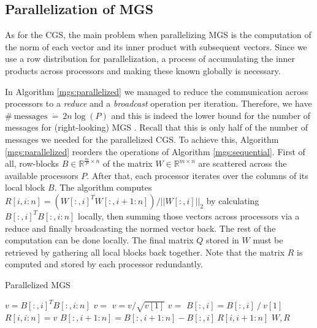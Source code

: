 \documentclass{article}
\begin{document}
\subsection{Parallelization of MGS}
As for the CGS, the main problem when parallelizing MGS is the computation of
the norm of each vector and its inner product with subsequent vectors. Since we
use a row distribution for parallelization, a process of accumulating the inner
products across processors and making these known globally is necessary.

In Algorithm \ref{mgs:parallelized} we managed to reduce the communication
across processors to a \textit{reduce} and a \textit{broadcast} operation per
iteration. Therefore, we have $\# \ \text{messages} \ \dot{=} \ 2n \log(P)$ and
this is indeed the lower bound for the number of messages for (right-looking)
MGS \cite{Grigori:2008}. Recall that this is only half of the number of messages
we needed for the parallelized CGS. To achieve this, Algorithm
\ref{mgs:parallelized} reorders the operations of Algorithm
\ref{mgs:sequential}. First of all, row-blocks $B \in \mathbb{R}^{\frac{m}{P}
\times n}$ of the matrix $W \in \mathbb{R}^{m \times n}$ are scattered across
the available processors $P$. After that, each processor iterates over the
columns of its local block $B$. The algorithm computes $R[i,i:n] = (W[:,i]^T
W[:,i+1:n]) / ||W[:,i]||_2$ by calculating $B[:,i]^T B[:,i:n]$ locally, then
summing those vectors across processors via a reduce and finally broadcasting
the normed vector back. The rest of the computation can be done locally. The
final matrix $Q$ stored in $W$ must be retrieved by gathering all local blocks
back together. Note that the matrix $R$ is computed and stored by each processor
redundantly.

\begin{algorithm}[t]
    \caption{Parallelized MGS} \label{mgs:parallelized}
    \begin{algorithmic}[1]
        \State {}
            \State $v = B[:,i]^T B[:,i:n]$
            \State $v =$ 
                \State $v = v / \sqrt{v[1]}$
            \EndIf
            \State $v =$ 
            \State $B[:,i] = B[:,i] \ / \ v[1]$
            \State $R[i,i:n] = v$
            \State $B[:,i+1:n] = B[:,i+1:n] - B[:,i] \ R[i,i+1:n]$
        \EndFor
        \State {}
        \State \Return $W, R$
    \end{algorithmic}
\end{algorithm}
\end{document}
